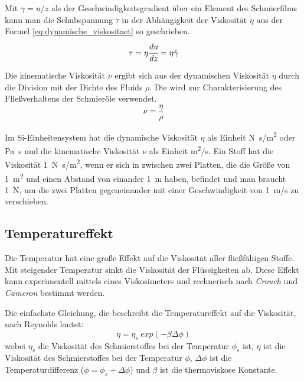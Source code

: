 Mit $\gamma = u/z$ als der Geschwindigkeitsgradient über ein Element des Schmierfilms kann man die Schubspannung $\tau$ in der Abhängigkeit der Viskosität $\eta$ aus der Formel \ref{eq:dynamische_viskositaet} so geschrieben.
\begin{equation}
    \tau = \eta \cfrac{du}{dz} = \eta \dot{\gamma}
    \label{eq:schubspannung}
\end{equation}


Die kinematische Viskosität $\nu$ ergibt sich aus der dynamischen Viskosität $\eta$ durch die Division mit der Dichte des Fluids $\rho$. Die wird zur Charakterisierung des Fließverhaltens der Schmieröle verwendet.
\begin{equation}
    \nu = \frac{\eta}{\rho}
    \label{eq:kinematische_viskotitaet}
\end{equation}

Im Si-Einheitensystem hat die dynamische Viskosität $\eta$ als Einheit \si{N.s/m^2} oder \si{\pascal.\s} und die kinematische Viskosität $\nu$ als Einheit \si{m^2/s}.
Ein Stoff hat die Viskosität \SI{1}{N.s/m^2}, wenn er sich in zwischen zwei Platten, die die Größe von \SI{1}{m^2} und einen Abstand von einander \SI{1}{m} haben, befindet und man braucht \SI{1}{N}, um die zwei Platten gegeneinander mit einer Geschwindigkeit von \SI{1}{m/s} zu verschieben.

\subsection*{Temperatureffekt}
\label{sub:temperatureffekt}
Die Temperatur hat eine große Effekt auf die Viskosität aller fließfähigen Stoffe.
Mit steigender Temperatur sinkt die Viskosität der Flüssigkeiten ab.
Diese Effekt kann experimentell mittels eines Viskosimeters und rechnerisch nach \textit{Crouch} und \textit{Cameron} \cite{crouch_1961} bestimmt werden.

Die einfachste Gleichung, die beschreibt die Temperatureffekt auf die Viskosität, nach Reynolds \cite{reynolds_1886} lautet:
\begin{equation}
    \eta = \eta_{s}  \ exp \left( -\beta  \Delta\phi \right)
    \label{eq:dynamische_viskositaet_reynold}
\end{equation}
%
wobei $\eta_{s}$ die Viskosität des Schmierstoffes bei der Temperatur $\phi_{s}$ ist, $\eta$ ist die Viskosität des Schmierstoffes bei der Temperatur $\phi$, $\Delta{\phi}$ ist die Temperaturdifferenz ($\phi = \phi_{s} + \Delta{\phi}$) und $\beta$ ist die thermoviskose Konstante.

